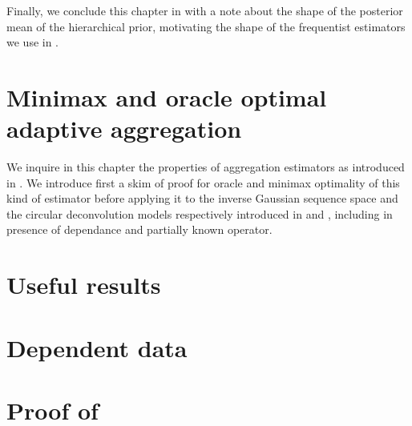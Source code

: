 \documentclass[a4paper,11pt]{book}
\begin{document}
 \medskip
%

\medskip

Finally, we conclude this chapter in  with a note about the shape of the posterior mean of the hierarchical prior, motivating the shape of the frequentist estimators we use in .





%

\chapter{Minimax and oracle optimal adaptive aggregation}\label{FREQ}
We inquire in this chapter the properties of aggregation estimators as introduced in .
We introduce first a skim of proof for oracle and minimax optimality of this kind of estimator before applying it to the inverse Gaussian sequence space and the circular deconvolution models respectively introduced in  and , including in presence of dependance and partially known operator.







%
\appendix
\chapter{Useful results}\label{USEFULRESULTS}

%
\chapter{Dependent data}\label{DEPENDENTDATA}

%
\chapter{Proof of \textsc{}}\label{PRO_BAYES_IGSSM_KNOWN_IID_ORACLE_NP}

\end{document}
